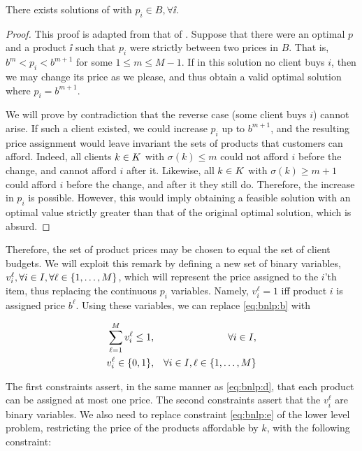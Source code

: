 \begin{lemma}
    There exists solutions of \bnlp with $p_i \in B, \forall \ii$.
\end{lemma}

\begin{proof}
    This proof is adapted from that of \cite{do:envy}. Suppose that there were
    an optimal $p$ and a product $\ii$ such that $p_i$ were strictly between two
    prices in $B$. That is, $b^m < p_i < b^{m+1}$ for some $1 \leq m \leq M -
    1$. If in this solution no client buys $i$, then we may change its price as
    we please, and thus obtain a valid optimal solution where $p_i=b^{m+1}$.

    We will prove by contradiction that the reverse case (some client buys $i$)
    cannot arise. If such a client existed, we could increase $p_i$ up to
    $b^{m+1}$, and the resulting price assignment would leave invariant the sets
    of products that customers can afford. Indeed, all clients ${k \in K}$ with
    $\sigma(k) \leq m$ could not afford $i$ before the change, and cannot afford
    $i$ after it. Likewise, all ${k \in K}$ with $\sigma(k) \geq m + 1$ could afford
    $i$ before the change, and after it they still do. Therefore, the increase
    in $p_i$ is possible. However, this would imply obtaining a feasible
    solution with an optimal value strictly greater than that of the original
    optimal solution, which is absurd.
\end{proof}

Therefore, the set of product prices may be chosen to equal the set of
client budgets. We will exploit this remark by defining a new set of binary
variables, $v_i^\ell, \forall{\ensuremath{i \in I}}, \forall{\ensuremath{\ell \in \{1, \ldots, M\}}}$, which will represent the price
assigned to the $i$'th item, thus replacing the continuous $p_i$ variables.
Namely, $v_i^\ell = 1$ iff product $i$ is assigned price $b^\ell$. Using these
variables, we can replace \eqref{eq:bnlp:b} with

\begin{eqnarray*}
    \sum_{\ell=1}^M v_i^\ell \leq 1, && \forall {\ensuremath{i \in I}},\\
    v_i^\ell \in {\ensuremath{\{ 0, 1 \}}},            && \forall {\ensuremath{i \in I}}, {\ell \in \{1, \ldots, M\}}
\end{eqnarray*}

\noindent
The first constraints assert, in the same manner as \eqref{eq:bnlp:d}, that each
product can be assigned at most one price. The second constraints assert that
the $v_i^\ell$ are binary variables. We also need to replace constraint
\eqref{eq:bnlp:e} of the lower level problem, restricting the price of the
products affordable by $k$, with the following constraint:

